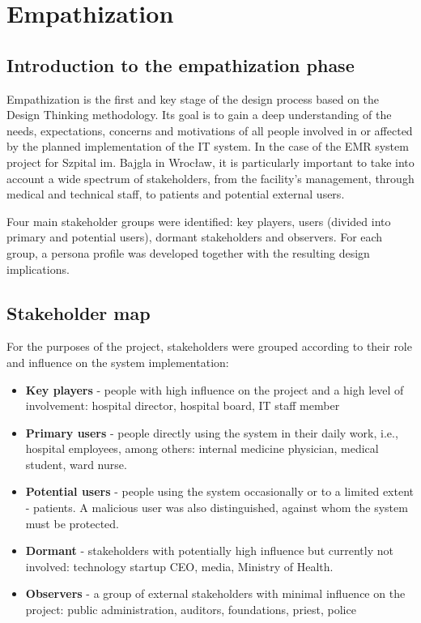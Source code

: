 \chapter{Empathization}

\section{Introduction to the empathization phase}

Empathization is the first and key stage of the design process based on the
Design Thinking methodology. Its goal is to gain a deep understanding of the needs, expectations, concerns and
motivations of all people involved in or affected by the planned implementation of the IT
system. In the case of the EMR system project for Szpital im. Bajgla in Wrocław,
it is particularly important to take into account a wide spectrum of stakeholders, from the facility's
management, through medical and technical staff, to patients and potential
external users.

Four
main stakeholder groups were identified: key players, users (divided into primary and potential users), dormant stakeholders and observers. For each group,
a persona profile was developed together with the resulting design implications.

\section{Stakeholder map}

For the purposes of the project, stakeholders were grouped according to their role and influence on the system implementation:

\begin{itemize}
    \item \textbf{Key players} - people with high influence on the project and a high level of involvement: hospital director, hospital board, IT staff member
    \item \textbf{Primary users} - people directly using the system in their daily work, i.e., hospital employees, among others: internal medicine physician, medical student, ward nurse.
    \item \textbf{Potential users} - people using the system occasionally or to a limited extent - patients. A malicious user was also distinguished, against whom the system must be protected.
    \item \textbf{Dormant} - stakeholders with potentially high influence but currently not involved: technology startup CEO, media, Ministry of Health.
    \item \textbf{Observers} - a group of external stakeholders with minimal influence on the project: public administration, auditors, foundations, priest, police
\end{itemize}

